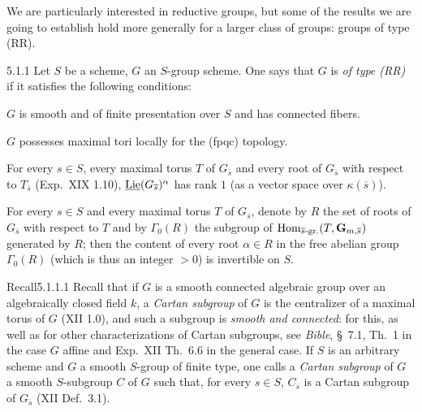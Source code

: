 \label{XXII.sec.5}
We are particularly interested in reductive groups, but some of the results we are going to establish hold more generally for a larger class of groups: groups of type (RR).
\begin{definition}{5.1.1}\label{XXII.5.1.1}
Let $S$ be a scheme, $G$ an $S$-group scheme. One says that $G$ is \emph{of type (RR)} if it satisfies the following conditions:
\begin{enumeratei}
\item $G$ is smooth and of finite presentation over $S$ and has connected fibers.
\item $G$ possesses maximal tori locally for the (fpqc) topology.
\item For every $s\in S$, every maximal torus $T$ of $G_{\overline s}$ and every root of $G_{\overline s}$ with respect to $T_{\overline s}$ (Exp.~XIX 1.10), $\underline{\operatorname{Lie}}(G_{\overline s})^\alpha$ has rank $1$ (as a vector space over $\kappa(\overline s)$).
\item For every $s\in S$ and every maximal torus $T$ of $G_{\overline s}$, denote by $R$ the set of roots of $G_{\overline s}$ with respect to $T$ and by $\Gamma_0(R)$ the subgroup of $\operatorname{Hom}_{\overline s\text{-gr.}}(T,\mathbf G_{m,\overline s})$ generated by $R$; then the content{\renewcommand{\thefootnote}{(22)}} of every root $\alpha\in R$ in the free abelian group $\Gamma_0(R)$ (which is thus an integer $>0$) is invertible on $S$.
\end{enumeratei}
\end{definition}
\begin{enoncerm}{Recall}{5.1.1.1}\label{XXII.5.1.1.1}
{\renewcommand{\thefootnote}{(23)}}%
Recall that if $G$ is a smooth connected algebraic group over an algebraically closed field $k$, a \emph{Cartan subgroup} of $G$ is the centralizer of a maximal torus of $G$ (XII 1.0), and such a subgroup is \emph{smooth and connected}: for this, as well as for other characterizations of Cartan subgroups, see \textit{Bible}, \S~7.1, Th.~1 in the case $G$ affine and Exp.~XII Th.~6.6 in the general case. If $S$ is an arbitrary scheme and $G$ a smooth $S$-group of finite type, one calls a \emph{Cartan subgroup} of $G$ a smooth $S$-subgroup $C$ of $G$ such that, for every $s\in S$, $C_{\overline s}$ is a Cartan subgroup of $G_{\overline s}$ (XII Def.~3.1).
\end{enoncerm}
